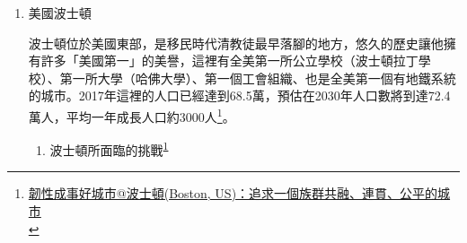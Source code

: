 \documentclass[a4paper,12pt]{article}
\begin{document}
\begin{enumerate}
\item 美國波士頓
\label{sec:orgcbc0d6e}

波士頓位於美國東部，是移民時代清教徒最早落腳的地方，悠久的歷史讓他擁有許多「美國第一」的美譽，這裡有全美第一所公立學校（波士頓拉丁學校）、第一所大學（哈佛大學）、第一個工會組織、也是全美第一個有地鐵系統的城市。2017年這裡的人口已經達到68.5萬，預估在2030年人口數將到達72.4萬人，平均一年成長人口約3000人\footnote{\href{https://eyesonplace.net/2018/12/28/10053/}{韌性成事好城市@波士頓(Boston, US)：追求一個族群共融、連貫、公平的城市}\\\label{org5f4119a}}。\\

\begin{enumerate}
\item 波士頓所面臨的挑戰\textsuperscript{\ref{org5f4119a}}
\label{sec:org34ccbd0}


\end{enumerate}
\end{enumerate}
\end{document}
